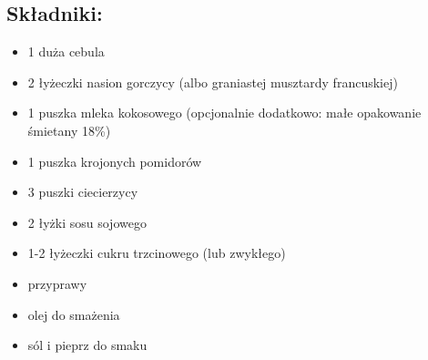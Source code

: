 \documentclass[a4paper,10pt]{book}
\begin{document}
\begin{multicols}{2}

\section*{Składniki:} \begin{itemize} 
\item 1 duża cebula 
\item 2 łyżeczki nasion gorczycy (albo graniastej musztardy francuskiej) 
\item 1 puszka mleka kokosowego (opcjonalnie dodatkowo: małe opakowanie śmietany 18\%) 
\item 1 puszka krojonych pomidorów 
\item 3 puszki ciecierzycy 
\item 2 łyżki sosu sojowego 
\item 1-2 łyżeczki cukru trzcinowego (lub zwykłego) 
\item przyprawy 
\item olej do smażenia 
\item sól i pieprz do smaku
\end{itemize}

\columnbreak

\begin{figure}[H] \centering {} \end{figure}

\end{multicols}

\vspace{0.5cm}
\end{document}
